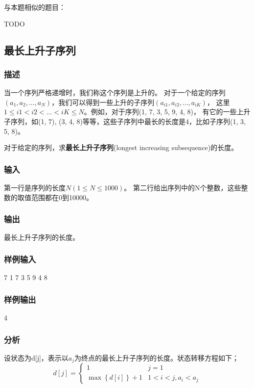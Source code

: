 与本题相似的题目：
\begindot
\item  TODO
\myenddot

\subsection{最长上升子序列}

\subsubsection{描述}
当一个序列严格递增时，我们称这个序列是上升的。
对于一个给定的序列$(a_1, a_2, ..., a_N)$，我们可以得到一些上升的子序列$(a_{i1}, a_{i2}, ..., a_{iK})$，
这里$1 \leq i1 < i2 < ... < iK \leq N$。例如，对于序列(1, 7, 3, 5, 9, 4, 8)，
有它的一些上升子序列，如(1, 7), (3, 4, 8)等等，这些子序列中最长的长度是4，比如子序列(1, 3, 5, 8)。

对于给定的序列，求\textbf{最长上升子序列}(longest increasing subsequence)的长度。

\subsubsection{输入}
第一行是序列的长度$N (1 \leq N \leq 1000)$。
第二行给出序列中的N个整数，这些整数的取值范围都在0到10000。

\subsubsection{输出}
最长上升子序列的长度。

\subsubsection{样例输入}
\begin{Code}
7
1 7 3 5 9 4 8
\end{Code}

\subsubsection{样例输出}
\begin{Code}
4
\end{Code}

\subsubsection{分析}
设状态为d[j]，表示以$a_j$为终点的最长上升子序列的长度。状态转移方程如下；
$$
d[j]=\begin{cases}
1 & j=1\\
\max\left\{d[i]\right\}+1 & 1<i<j,a_i<a_j
\end{cases}
$$

